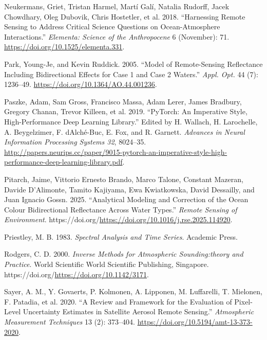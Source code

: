 \documentclass[
  letterpaper,
  open=any]{scrbook}
\newlength{\cslhangindent}
\newenvironment{CSLReferences}[2] %
 {\begin{list}{}{%
  \setlength{\itemindent}{0pt}
  \setlength{\leftmargin}{0pt}
  \setlength{\parsep}{0pt}
  \ifodd #1
   \setlength{\leftmargin}{\cslhangindent}
   \setlength{\itemindent}{-1\cslhangindent}
  \fi
  \setlength{\itemsep}{#2\baselineskip}}}
 {\end{list}}
\begin{document}
\begin{CSLReferences}{1}{0}
Neukermans, Griet, Tristan Harmel, Martí Galí, Natalia Rudorff, Jacek
Chowdhary, Oleg Dubovik, Chris Hostetler, et al. 2018. {``Harnessing
Remote Sensing to Address Critical Science Questions on Ocean-Atmosphere
Interactions.''} \emph{Elementa: Science of the Anthropocene} 6
(November): 71. \url{https://doi.org/10.1525/elementa.331}.

Park, Young-Je, and Kevin Ruddick. 2005. {``Model of Remote-Sensing
Reflectance Including Bidirectional Effects for Case 1 and Case 2
Waters.''} \emph{Appl. Opt.} 44 (7): 1236--49.
\url{https://doi.org/10.1364/AO.44.001236}.

Paszke, Adam, Sam Gross, Francisco Massa, Adam Lerer, James Bradbury,
Gregory Chanan, Trevor Killeen, et al. 2019. {``PyTorch: An Imperative
Style, High-Performance Deep Learning Library.''} Edited by H. Wallach,
H. Larochelle, A. Beygelzimer, F. dAlché-Buc, E. Fox, and R. Garnett.
\emph{Advances in Neural Information Processing Systems 32}, 8024--35.
\url{http://papers.neurips.cc/paper/9015-pytorch-an-imperative-style-high-performance-deep-learning-library.pdf}.

Pitarch, Jaime, Vittorio Ernesto Brando, Marco Talone, Constant Mazeran,
Davide D'Alimonte, Tamito Kajiyama, Ewa Kwiatkowska, David Dessailly,
and Juan Ignacio Gossn. 2025. {``Analytical Modeling and Correction of
the Ocean Colour Bidirectional Reflectance Across Water Types.''}
\emph{Remote Sensing of Environment}.
https://doi.org/\url{https://doi.org/10.1016/j.rse.2025.114920}.

Priestley, M. B. 1983. \emph{Spectral Analysis and Time Series}.
Academic Press.

Rodgers, C. D. 2000. \emph{Inverse Methods for Atmospheric
Sounding:theory and Practice}. World Scientific World Scientific
Publishing, Singapore.
https://doi.org/\url{https://doi.org/10.1142/3171}.

Sayer, A. M., Y. Govaerts, P. Kolmonen, A. Lipponen, M. Luffarelli, T.
Mielonen, F. Patadia, et al. 2020. {``A Review and Framework for the
Evaluation of Pixel-Level Uncertainty Estimates in Satellite Aerosol
Remote Sensing.''} \emph{Atmospheric Measurement Techniques} 13 (2):
373--404. \url{https://doi.org/10.5194/amt-13-373-2020}.


\end{CSLReferences}
\end{document}
